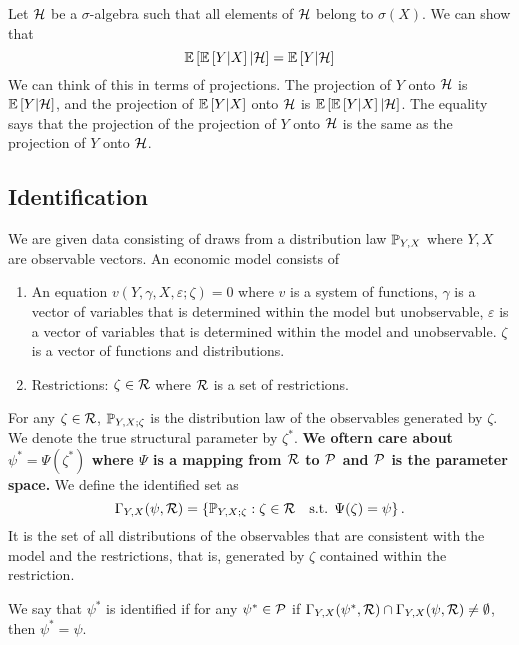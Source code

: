 \begin{exercise}
    Let $\mathcal{H}$ be a $\sigma$-algebra such that all elements of $\mathcal{H}$  belong to $\sigma(X)$. We can show that \begin{equation*}
        \mathbb{E}\left[\mathbb{E}\left[Y|X\right]|\mathcal{H}\right] = \mathbb{E}\left[Y|\mathcal{H}\right]
    \end{equation*}
    We can think of this in terms of projections. The projection of $Y$ onto $\mathcal{H}$ is $\mathbb{E}\left[Y|\mathcal{H}\right]$, and the projection of $\mathbb{E}\left[Y|X\right]$ onto $\mathcal{H}$ is $\mathbb{E}\left[\mathbb{E}\left[Y|X\right]|\mathcal{H}\right]$. The equality says that the projection of the projection of $Y$ onto $\mathcal{H}$ is the same as the projection of $Y$ onto $\mathcal{H}$.
\end{exercise}
\subsection{Identification}
We are given data consisting of draws from a distribution law $\mathbb{P}_{Y,X}$ where $Y,X$ are observable vectors.
An economic model consists of 
\begin{enumerate}
    \item An equation $v(Y,\gamma,X,\varepsilon;\zeta)=0$ where $v$ is a system of functions, $\gamma$ is a vector of variables that is determined within the model but unobservable, $\varepsilon$ is a vector of variables that is determined within the model and unobservable. $\zeta$ is a vector of functions and distributions.
    \item Restrictions: $\zeta \in \mathcal{R}$ where $\mathcal{R}$ is a set of restrictions.
\end{enumerate}
For any $\zeta \in \mathcal{R}$, $\mathbb{P}_{Y,X;\zeta}$ is the distribution law of the observables generated by $\zeta$. We denote the true structural parameter by $\zeta^*$. \textbf{We oftern care about $\psi^*=\Psi(\zeta^*)$ where $\Psi$ is a mapping from $\mathcal{R}$ to $\mathcal{P}$ and $\mathcal{P}$ is the parameter space.}
We define the identified set as
\begin{equation*}
    \Gamma_{Y,X}(\psi,\mathcal{R}) = \left\{\mathbb{P}_{Y,X;\zeta}:\zeta \in \mathcal{R} \quad \text{s.t. }\Psi(\zeta)=\psi\right\}.
\end{equation*} It is the set of all distributions of the observables that are consistent with the model and the restrictions, that is, generated by $\zeta$ contained within the restriction. 
\begin{definition}[Identification]
    We say that $\psi^*$ is identified if for any $\psi^* \in \mathcal{P}$ if $ \Gamma_{Y,X}(\psi^*,\mathcal{R}) \cap \Gamma_{Y,X}(\psi,\mathcal{R}) \neq \emptyset$, then $\psi^*=\psi$.
\end{definition}
